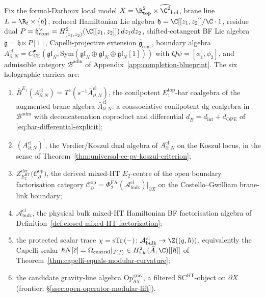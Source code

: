 \begin{defn}\label{defn:six-carriers}
Fix the formal-Darboux local model
\(X=\R^2_{\mathrm{top}}\times\widehat{\C^2}_{\mathrm{hol}}\),
brane line \(L=\R_t\times\{b\}\), reduced Hamiltonian Lie algebra
\(\mathfrak h=\C[[z_1,z_2]]/\C\cdot 1\), residue dual
\(P=\mathfrak h^\vee_{\mathrm{cont}}=
H^2_{(z_1,z_2)}(\C[[z_1,z_2]])\,dz_1dz_2\), shifted-cotangent BF Lie
algebra \(\mathfrak g=\mathfrak h\ltimes P[1]\), Capelli-projective
extension \(\widehat{\mathfrak g}_{\mathrm{cent}}\), boundary algebra
\(A^{\mathrm{cl}}_{\partial,N}=
C^\bullet_{\mathrm{CE}}(\mathfrak{gl}_N,
\mathrm{Sym}(\mathfrak{gl}_N\oplus\mathfrak{gl}_N\oplus\mathfrak{gl}_N[1]))\)
with \(Q\psi=[\phi_1,\phi_2]\), and admissible category
\(\mathcal B^{\mathrm{adm}}\) of
Appendix~\ref{app:completion-blueprint}.  The six holographic
carriers are:
\begin{enumerate}[label=\textup{(C\arabic*)}]
  \item \(\bar B^{E_1}(A^{\mathrm{cl}}_{\partial,N})
        =T^{\mathrm{c}}(s^{-1}\bar A^{\mathrm{cl}}_{\partial,N})\),
        the conilpotent \(E_1^{\mathrm{top}}\)-bar coalgebra of the
        augmented brane algebra
        \(\bar A^{\mathrm{cl}}_{\partial,N}\):
        a coassociative conilpotent dg coalgebra in
        \(\mathcal B^{\mathrm{adm}}\) with deconcatenation coproduct and
        differential \(d_{\bar B}=d_{\mathrm{int}}+d_{\mathrm{OPE}}\)
        of \eqref{eq:bar-differential-explicit};
  \item \((A^{\mathrm{cl}}_{\partial,N})^!\), the Verdier/Koszul
        dual algebra of \(A^{\mathrm{cl}}_{\partial,N}\) on the Koszul
        locus, in the sense of
        Theorem~\ref{thm:universal-ce-pv-koszul-criterion};
  \item \(Z^{\mathrm{der}}_{E_2^{\mathrm{HT}}}\!\bigl(
        \mathcal C^{\mathrm{op}}_\partial\bigr)\), the derived mixed-HT
        \(E_2\)-centre of the open boundary factorisation category
        \(\mathcal C^{\mathrm{op}}_\partial=
        \Phi^{\mathrm{FA}}_2(\mathcal A^{\mathrm{cl}}_{\mathrm{bulk}})
        \big|_{\partial X}\) on the Costello--Gwilliam brane-link
        boundary;
  \item \(\mathcal A^{\mathrm{cl}}_{\mathrm{bulk}}\), the physical
        bulk mixed-HT Hamiltonian BF factorisation algebra of
        Definition~\ref{def:closed-mixed-HT-factorization};
  \item the protected scalar trace
        \(\chi=\operatorname{sTr}\,(-)\colon
        \mathcal A^{\mathrm{cl}}_{\mathrm{bulk}}\to\Z((q,\hbar))\),
        equivalently the Capelli scalar
        \(\hbar N[\bar c]=\Omega_{\mathrm{central}}|_{J(f)}\in
        H^2_{\mathrm{Lie}}(\bar A,\C)[[\hbar]]\) of
        Theorem~\ref{thm:capelli-equals-modular-curvature};
  \item the candidate gravity-line algebra
        \(\mathrm{Op}^{\mathrm{grav}}_{\partial X}\), a filtered
        \(\mathrm{SC}^{\mathrm{HT}}\)-object on \(\partial X\)
        (frontier; \S\ref{ssec:open-operator-modular-lift}).
\end{enumerate}
\end{defn}

